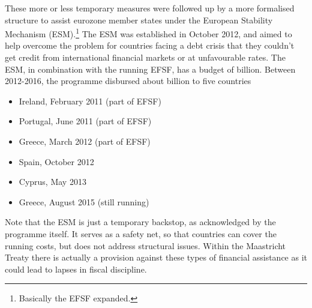 \documentclass{tufte-handout}
\begin{document}
These more or less temporary measures were followed up by a more formalised structure to assist eurozone member states under the European Stability Mechanism (ESM).\footnote{Basically the EFSF expanded.}
The ESM was established in October 2012, and aimed to help overcome the problem for countries facing a debt crisis that they couldn't get credit from international financial markets or at unfavourable rates. 
The ESM, in combination with the running EFSF, has a budget of  billion.
Between 2012-2016, the programme disbursed about  billion to five countries
\begin{itemize}
  \item Ireland, February 2011 (part of EFSF)
  \item Portugal, June 2011 (part of EFSF)
  \item Greece, March 2012 (part of EFSF)
  \item Spain, October 2012
  \item Cyprus, May 2013
  \item Greece, August 2015 (still running)
\end{itemize}

Note that the ESM is just a temporary backstop, as acknowledged by the programme itself. 
It serves as a safety net, so that countries can cover the running costs, but does not address structural issues. 
Within the Maastricht Treaty there is actually a provision against these types of financial assistance as it could lead to lapses in fiscal discipline. 

\clearpage
\end{document}
